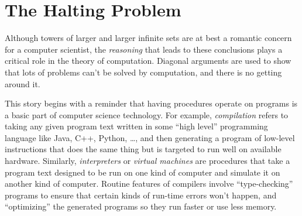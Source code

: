 \begin{problems}
\practiceproblems


\classproblems
{}

\homeworkproblems
{}

\examproblems
{}
\end{problems}

\section{The Halting Problem}\label{halting_sec}

Although towers of larger and larger infinite sets are at best a
romantic concern for a computer scientist, the \emph{reasoning} that
leads to these conclusions plays a critical role in the theory of
computation.  Diagonal arguments are used to show that lots of
problems can't be solved by computation, and there is no getting
around it.

This story begins with a reminder that having procedures operate on
programs is a basic part of computer science technology.  For example,
\emph{compilation} refers to taking any given program text
written in some ``high level'' programming language like Java, C++,
Python, \dots, and then generating a program of low-level instructions
that does the same thing but is targeted to run well on available
hardware.  Similarly, \emph{interpreters} or \emph{virtual
    machines} are procedures that take a program text designed to be
run on one kind of computer and simulate it on another kind of
computer.  Routine features of compilers involve
``type-checking''%
programs to ensure that certain kinds of
run-time errors won't happen, and ``optimizing'' the generated
programs so they run faster or use less memory.

